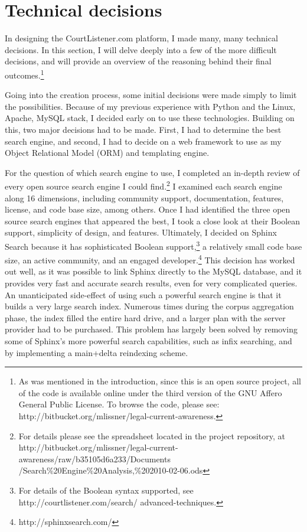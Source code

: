 \label{techdecisions}
\section{Technical decisions}
In designing the CourtListener.com platform, I made many, many technical decisions. In this section, I will delve deeply into a few of the more difficult decisions, and will provide an overview of the reasoning behind their final outcomes.\footnote{As was mentioned in the introduction, since this is an open source project, all of the code is available online under the third version of the GNU Affero General Public License. To browse the code, please see: http://bitbucket.org/mlissner/legal-current-awareness.}

Going into the creation process, some initial decisions were made simply to limit the possibilities. Because of my previous experience with Python and the Linux, Apache, MySQL stack, I decided early on to use these technologies. Building on this, two major decisions had to be made. First, I had to determine the best search engine, and second, I had to decide on a web framework to use as my Object Relational Model (ORM) and templating engine. 

For the question of which search engine to use, I completed an in-depth review of every open source search engine I could find.\footnote{For details please see the spreadsheet located in the project repository, at http://bitbucket.org/mlissner/legal-current-awareness/raw/b35105d6a233/Documents /Search\%20Engine\%20Analysis,\%202010-02-06.ods} I examined each search engine along 16 dimensions, including community support, documentation, features, license, and code base size, among others. Once I had identified the three open source search engines that appeared the best, I took a close look at their Boolean support, simplicity of design, and features. Ultimately, I decided on Sphinx Search because it has sophisticated Boolean support,\footnote{For details of the Boolean syntax supported, see http://courtlistener.com/search/ advanced-techniques.} a relatively small code base size, an active community, and an engaged developer.\footnote{http://sphinxsearch.com/} This decision has worked out well, as it was possible to link Sphinx directly to the MySQL database, and it provides very fast and accurate search results, even for very complicated queries. An unanticipated side-effect of using such a powerful search engine is that it builds a very large search index. Numerous times during the corpus aggregation phase, the index filled the entire hard drive, and a larger plan with the server provider had to be purchased. This problem has largely been solved by removing some of Sphinx's more powerful search capabilities, such as infix searching, and by implementing a main+delta reindexing scheme. 

